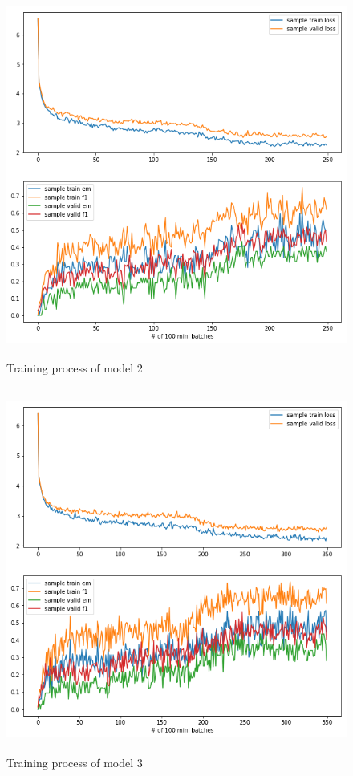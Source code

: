 \documentclass[modernstyle,12pt]{sjsuthesis}
\theoremstyle{definition}
\begin{document}
\begin{figure}[htbp]\centering
  \includegraphics[width=12cm, height=12cm]{figures/match_baseline.png}
  \caption{Training process of model 2}
  \label{f:baseline_change0}
\end{figure}

\begin{figure}[htbp]\centering
  \includegraphics[width=12cm, height=12cm]{figures/match_change1.png}
  \caption{Training process of model 3}
  \label{f:baseline_change1}
\end{figure}
\end{document}

